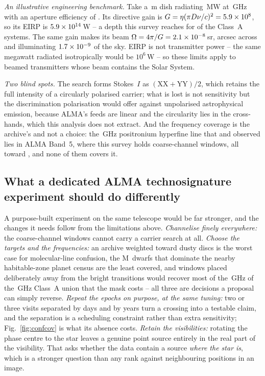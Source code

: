 \noindent\emph{An illustrative engineering benchmark.} Take a \BenchDiam\,m dish radiating \BenchPowerMW\,MW at
\BenchFreqGHz\,GHz with an aperture efficiency of \BenchEta. Its directive
gain is $G=\eta(\pi D\nu/c)^{2}=5.9\times10^{8}$, so its EIRP is
$5.9\times10^{14}$\,W -- a depth this survey reaches for \BenchNSysA{} of the
\NSysClassA{} Class~A systems. The same gain makes its beam
$\Omega=4\pi/G=2.1\times10^{-8}$\,sr, \BmArcsec{} arcsec across and illuminating
$1.7\times10^{-9}$ of the sky. EIRP is not transmitter power -- the same megawatt
radiated isotropically would be $10^{6}$\,W -- so these limits apply to
beamed transmitters whose beam contains the Solar System.

\noindent\emph{Two blind spots.} The search forms Stokes~$I$ as
$(\mathrm{XX}+\mathrm{YY})/2$, which retains the full intensity of a circularly polarised
carrier; what is lost is not sensitivity but the discrimination polarisation
would offer against unpolarised astrophysical emission, because ALMA's feeds
are linear and the circularity lies in the cross-hands, which this analysis
does not extract. And the frequency coverage is the archive's and not a
choice: the \SbPriorFreqGHz\,GHz positronium hyperfine line that
\citet{Steffes1994} and \citet{Mauersberger1996} observed lies in ALMA Band~5,
where this survey holds
\LnBFiveWin{} coarse-channel windows, all toward \LnBFiveStars, and none of
them covers it.

\subsection{What a dedicated ALMA technosignature experiment should do
differently}
\label{sec:future}

A purpose-built experiment on the same telescope would be far stronger, and
the changes it needs follow from the limitations above. \emph{Channelise
finely everywhere:} the \NCoarse{} coarse-channel windows cannot carry a
carrier search at all.
\emph{Choose the targets and the frequencies:} an archive weighted toward
dusty discs is the worst case for molecular-line confusion, the M~dwarfs that
dominate the nearby habitable-zone planet census are the least covered, and
windows placed deliberately away from the bright transitions would recover
most of the \MkMaskAGHz\,GHz of the \CvUnionA\,GHz Class~A union that the
mask costs -- all three are decisions a
proposal can simply reverse. \emph{Repeat the epochs on purpose, at the same
tuning:} two or three visits separated by days and by years turn a crossing
into a testable claim, and the separation is a scheduling constraint rather
than extra sensitivity; Fig.~\ref{fig:confcov} is what its absence costs.
\emph{Retain the visibilities:} rotating the phase centre to the star leaves a
genuine point source entirely in the real part of the visibility. That asks
whether the data contain a source \emph{where the star is}, which is a
stronger question than any rank
against neighbouring positions in an image.
